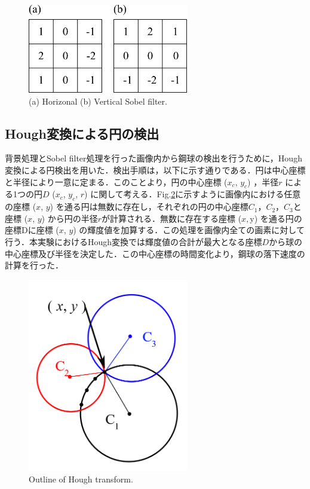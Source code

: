 \begin{figure}[h]
    \centering
    \includegraphics[width=7.0cm,clip]{3-Analysis/sobel-filter.png}
    \caption{(a) Horizonal (b) Vertical Sobel filter.}
    \label{fig:sobel}
\end{figure}

\subsection{Hough変換による円の検出}
背景処理とSobel filter処理を行った画像内から鋼球の検出を行うために，Hough変換による円検出を用いた．検出手順は，以下に示す通りである．円は中心座標と半径により一意に定まる．このことより，円の中心座標 ($x_c$, $y_c$) ，半径$r$ による1つの円$D$ ($x_c$, $y_c$, $r$) に関して考える．Fig.\ref{fig:hough}に示すように画像内における任意の座標 ($x$, $y$) を通る円は無数に存在し，それぞれの円の中心座標$C_1$，$C_2$，$C_3$と座標 ($x$, $y$) から円の半径$r$が計算される．無数に存在する座標 ($x, $y) を通る円の座標Dに座標 ($x$, $y$) の輝度値を加算する．この処理を画像内全ての画素に対して行う．本実験におけるHough変換では輝度値の合計が最大となる座標$D$から球の中心座標及び半径を決定した．この中心座標の時間変化より，鋼球の落下速度の計算を行った．

\begin{figure}[h]
    \centering
    \includegraphics[width=7.0cm,clip]{3-Analysis/hough.PNG}
    \caption{Outline of Hough transform.}
    \label{fig:hough}
\end{figure}
